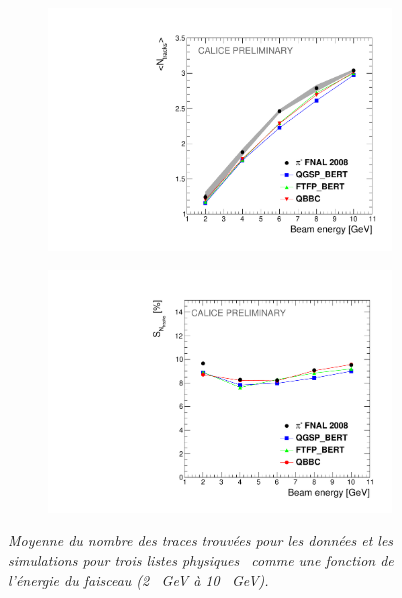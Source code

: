 \begin{figure}
	\centering
	\begin{subfigure}{0.5\textwidth}
		\centering
		\includegraphics[width=.90\linewidth]{ECAL/plots/ntracks-graph.pdf}
		\caption{\label{fig:tracksgraphF} }
	\end{subfigure}%
	\begin{subfigure}{0.5\textwidth}
		\centering
		\includegraphics[width=.90\linewidth]{ECAL/plots/ntracks-graph-delta.pdf}
		\caption{\label{fig:dtracksgraphF}}
	\end{subfigure}
	\caption{\label{fig:fulltrackgraphF} \sl Moyenne du nombre des traces trouvées pour les données et les simulations  pour trois listes physiques \geant\ comme une fonction de l'énergie du faisceau (2 \, GeV à 10 \, GeV). }
\end{figure}


\newpage
